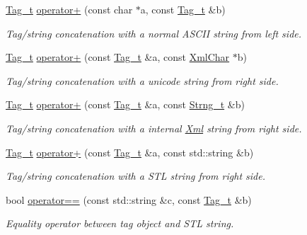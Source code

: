 \begin{DoxyCompactItemize}
\hyperlink{class_d_d4hep_1_1_x_m_l_1_1_tag__t}{Tag\+\_\+t} \hyperlink{group___d_d4_h_e_p___x_m_l_ga16ba3dffdb36f1a0ae319fde7dcdb5ca}{operator+} (const char $\ast$a, const \hyperlink{class_d_d4hep_1_1_x_m_l_1_1_tag__t}{Tag\+\_\+t} \&b)
\begin{DoxyCompactList}\small\item\em Tag/string concatenation with a normal A\+S\+C\+II string from left side. \end{DoxyCompactList}\item 
\hyperlink{class_d_d4hep_1_1_x_m_l_1_1_tag__t}{Tag\+\_\+t} \hyperlink{group___d_d4_h_e_p___x_m_l_ga658bb45f4c5cc614a2508957b27c0bd7}{operator+} (const \hyperlink{class_d_d4hep_1_1_x_m_l_1_1_tag__t}{Tag\+\_\+t} \&a, const \hyperlink{namespace_d_d4hep_1_1_x_m_l_a09e5d9cc86ed782f6826dfe0778c1815}{Xml\+Char} $\ast$b)
\begin{DoxyCompactList}\small\item\em Tag/string concatenation with a unicode string from right side. \end{DoxyCompactList}\item 
\hyperlink{class_d_d4hep_1_1_x_m_l_1_1_tag__t}{Tag\+\_\+t} \hyperlink{group___d_d4_h_e_p___x_m_l_ga64cd4f3e74d5147d8a0dda8d7dc5b372}{operator+} (const \hyperlink{class_d_d4hep_1_1_x_m_l_1_1_tag__t}{Tag\+\_\+t} \&a, const \hyperlink{class_d_d4hep_1_1_x_m_l_1_1_strng__t}{Strng\+\_\+t} \&b)
\begin{DoxyCompactList}\small\item\em Tag/string concatenation with a internal \hyperlink{union_xml}{Xml} string from right side. \end{DoxyCompactList}\item 
\hyperlink{class_d_d4hep_1_1_x_m_l_1_1_tag__t}{Tag\+\_\+t} \hyperlink{group___d_d4_h_e_p___x_m_l_ga4296bedbf278d7bbd894b9e07bedf79a}{operator+} (const \hyperlink{class_d_d4hep_1_1_x_m_l_1_1_tag__t}{Tag\+\_\+t} \&a, const std\+::string \&b)
\begin{DoxyCompactList}\small\item\em Tag/string concatenation with a S\+TL string from right side. \end{DoxyCompactList}\item 
bool \hyperlink{group___d_d4_h_e_p___x_m_l_ga147592045f1692bc1bce671299c71a77}{operator==} (const std\+::string \&c, const \hyperlink{class_d_d4hep_1_1_x_m_l_1_1_tag__t}{Tag\+\_\+t} \&b)
\begin{DoxyCompactList}\small\item\em Equality operator between tag object and S\+TL string. \end{DoxyCompactList}\item 

\end{DoxyCompactItemize}
